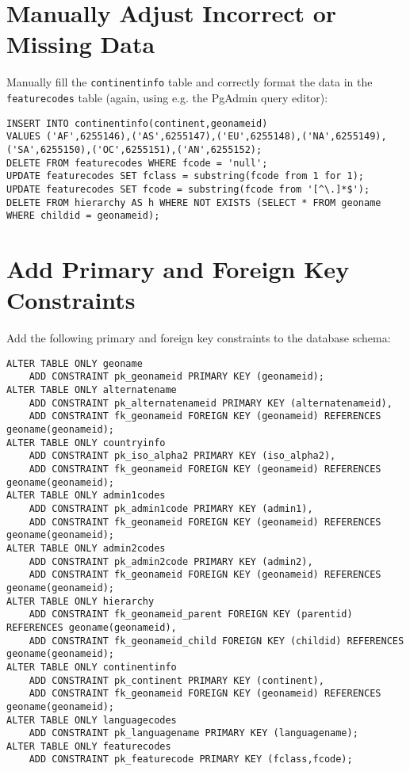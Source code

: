 \documentclass[fontsize=12pt, BCOR=10mm, DIV=14, parskip=true,headings=small]{scrartcl}
\begin{document}
\section{Manually Adjust Incorrect or Missing Data}
Manually fill the \texttt{continentinfo} table and correctly format the data in the \texttt{featurecodes} table (again, using e.g. the PgAdmin query editor):
\begin{lstlisting}[breaklines]
INSERT INTO continentinfo(continent,geonameid) 
VALUES ('AF',6255146),('AS',6255147),('EU',6255148),('NA',6255149), ('SA',6255150),('OC',6255151),('AN',6255152);
DELETE FROM featurecodes WHERE fcode = 'null';
UPDATE featurecodes SET fclass = substring(fcode from 1 for 1);
UPDATE featurecodes SET fcode = substring(fcode from '[^\.]*$');
DELETE FROM hierarchy AS h WHERE NOT EXISTS (SELECT * FROM geoname WHERE childid = geonameid);
\end{lstlisting}

\section{Add Primary and Foreign Key Constraints}

Add the following primary and foreign key constraints to the database schema:
\begin{lstlisting}[breaklines]
ALTER TABLE ONLY geoname
    ADD CONSTRAINT pk_geonameid PRIMARY KEY (geonameid);
ALTER TABLE ONLY alternatename
    ADD CONSTRAINT pk_alternatenameid PRIMARY KEY (alternatenameid),
    ADD CONSTRAINT fk_geonameid FOREIGN KEY (geonameid) REFERENCES geoname(geonameid);
ALTER TABLE ONLY countryinfo
    ADD CONSTRAINT pk_iso_alpha2 PRIMARY KEY (iso_alpha2),
    ADD CONSTRAINT fk_geonameid FOREIGN KEY (geonameid) REFERENCES geoname(geonameid);
ALTER TABLE ONLY admin1codes
    ADD CONSTRAINT pk_admin1code PRIMARY KEY (admin1),
    ADD CONSTRAINT fk_geonameid FOREIGN KEY (geonameid) REFERENCES geoname(geonameid);
ALTER TABLE ONLY admin2codes
    ADD CONSTRAINT pk_admin2code PRIMARY KEY (admin2),
    ADD CONSTRAINT fk_geonameid FOREIGN KEY (geonameid) REFERENCES geoname(geonameid);
ALTER TABLE ONLY hierarchy
    ADD CONSTRAINT fk_geonameid_parent FOREIGN KEY (parentid) REFERENCES geoname(geonameid),
    ADD CONSTRAINT fk_geonameid_child FOREIGN KEY (childid) REFERENCES geoname(geonameid);
ALTER TABLE ONLY continentinfo
    ADD CONSTRAINT pk_continent PRIMARY KEY (continent),
    ADD CONSTRAINT fk_geonameid FOREIGN KEY (geonameid) REFERENCES geoname(geonameid);
ALTER TABLE ONLY languagecodes
    ADD CONSTRAINT pk_languagename PRIMARY KEY (languagename);
ALTER TABLE ONLY featurecodes
    ADD CONSTRAINT pk_featurecode PRIMARY KEY (fclass,fcode);
\end{lstlisting}
\end{document}
